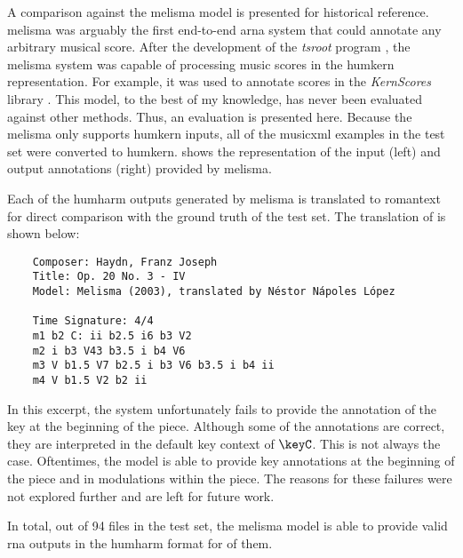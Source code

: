 
A comparison against the \gls{melisma} model is presented
for historical reference. \gls{melisma} was arguably the
first end-to-end \gls{arna} system that could annotate any
arbitrary musical score. After the development of the
\emph{tsroot} program \parencite{sapp2009tsroot}, the
\gls{melisma} system was capable of processing music scores
in the \gls{humkern} representation. For example, it was
used to annotate scores in the \emph{KernScores} library
\parencite{sapp2005online}. This model, to the best of my
knowledge, has never been evaluated against other methods.
Thus, an evaluation is presented here. Because the
\gls{melisma} only supports \gls{humkern} inputs, all of the
\gls{musicxml} examples in the test set were converted to
\gls{humkern}.  shows the
representation of the input (left) and output annotations
(right) provided by \gls{melisma}.


Each of the \gls{humharm} outputs generated by \gls{melisma}
is translated to \gls{romantext} for direct comparison with
the ground truth of the test set. The translation of
 is shown below:

\begin{verbatim}
    Composer: Haydn, Franz Joseph
    Title: Op. 20 No. 3 - IV
    Model: Melisma (2003), translated by Néstor Nápoles López
    
    Time Signature: 4/4
    m1 b2 C: ii b2.5 i6 b3 V2
    m2 i b3 V43 b3.5 i b4 V6
    m3 V b1.5 V7 b2.5 i b3 V6 b3.5 i b4 ii
    m4 V b1.5 V2 b2 ii
\end{verbatim}

In this excerpt, the system unfortunately fails to provide
the annotation of the key at the beginning of the piece.
Although some of the annotations are correct, they are
interpreted in the default key context of $\keyC$. This is
not always the case. Oftentimes, the model is able to
provide key annotations at the beginning of the piece and in
modulations within the piece. The reasons for these failures
were not explored further and are left for future work.

In total, out of 94 files in the test set, the \gls{melisma}
model is able to provide valid \gls{rna} outputs in the
\gls{humharm} format for  of them.
